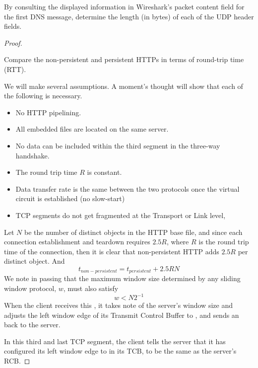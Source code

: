 \documentclass[../../main.tex]{subfiles}
\begin{document}
\begin{wts}
By consulting the displayed information in Wireshark’s packet content field for the first DNS message, determine the length (in bytes) of each of the UDP header fields.
\end{wts}
\begin{proof}
\begin{wts}
    Compare the non-persistent and persistent HTTPs in terms of round-trip time (RTT).
\end{wts}

    We will make several assumptions. A moment's thought will show that each of the following is necessary.
    \begin{itemize}
        \item No HTTP pipelining.
        \item All embedded files are located on the same server.
        \item No data can be included within the third segment in the three-way handshake.
        \item The round trip time $R$ is constant.
        \item Data transfer rate is the same between the two protocols once the virtual circuit is established (no slow-start)
        \item TCP segments do not get fragmented at the Transport or Link level,
    \end{itemize}
    Let $N$ be the number of distinct objects in the HTTP base file, and since each connection establishment and teardown requires $2.5R$, where $R$ is the round trip time of the connection, then it is clear that non-persistent HTTP adds $2.5R$ per distinct object. And
    \[t_{non-persistent}=t_{persistent}+2.5RN\]
    We note in passing that the maximum window size determined by any sliding window protocol, $w$, must also satisfy \[w< N2^{-1}\]When the client receives this , it takes note of the server’s window size and adjusts the left window edge of its Transmit Control Buffer to , and sends an  back to the server.

In this third and last TCP segment, the client tells the server that it has configured its left window edge to  in its TCB, to be the same as the server’s RCB.

\end{proof}
\end{document}
